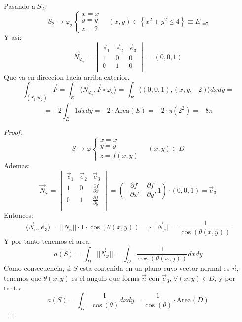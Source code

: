 {    Pasando a $S_2$:
    $$ S_2 \rightarrow \varphi_2
    \begin{cases}
        x = x \\
        y = y \\
        z = 2
    \end{cases}
    \quad
    \left(x,y\right) \in \left\{ x^2 + y^2 \leq 4 \right\} \equiv E_\text{r=2}$$
    Y así:
    $$ \vec{N}_{\varphi_2} =
    \begin{vmatrix}
        \vec{e}_1 & \vec{e}_2 & \vec{e}_3 \\
        1 & 0 & 0 \\
        0 & 1 & 0 \\
    \end{vmatrix} =
    (0,0,1)$$
    Que va en direccion hacia arriba exterior.
    $$ \int_{(S_2, \vec{n}_2)} \vec{F} = \int_E \langle \vec{N}_{\varphi_2}, \vec{F} \circ \varphi_2 \rangle = \int_E \langle (0,0,1), (x,y,-2) \rangle dx dy =$$
    $$= -2\int_E 1 dx dy = -2 \cdot \text{Area}(E) = -2 \cdot \pi (2^2) = -8\pi$$
}


\begin{proof}
    $$ S \rightarrow \varphi
    \begin{cases}
        x = x \\
        y = y \\
        z = f(x,y)
    \end{cases}
    \quad
    \left(x,y\right) \in D$$
    Ademas:
    $$ \vec{N}_{\varphi} =
    \begin{vmatrix}
        \vec{e}_1 & \vec{e}_2 & \vec{e}_3 \\
        1 & 0 & \frac{\partial f}{\partial x} \\
        0 & 1 & \frac{\partial f}{\partial y} \\
    \end{vmatrix} = \left( -\frac{\partial f}{\partial x}, -\frac{\partial f}{\partial y}, 1 \right) \cdot (0,0,1) = \vec{e}_3$$
    Entonces:
    $$ \langle \vec{N}_{\varphi}, \vec{e}_3 \rangle = ||\vec{N}_{\varphi}|| \cdot 1 \cdot \cos(\theta(x,y)) \implies ||\vec{N}_{\varphi}|| = \frac{1}{\cos(\theta(x,y))}$$
    Y por tanto tenemos el area:
    $$ a(S) = \int_{D} ||\vec{N}_{\varphi}|| = \int_D \frac{1}{\cos(\theta(x,y))} dx dy$$
    Como consecuencia, si $S$ esta contenida en un plano cuyo vector normal es $\vec{n}$, tenemos que $\theta(x,y)$ es el angulo que forma $\vec{n}$ con $\vec{e}_3$, $\forall (x,y) \in D$, y por tanto:
    $$ a(S) = \int_{D} \frac{1}{\cos(\theta)} dx dy = \frac{1}{\cos(\theta)} \cdot \text{Area}(D)$$

\end{proof}

